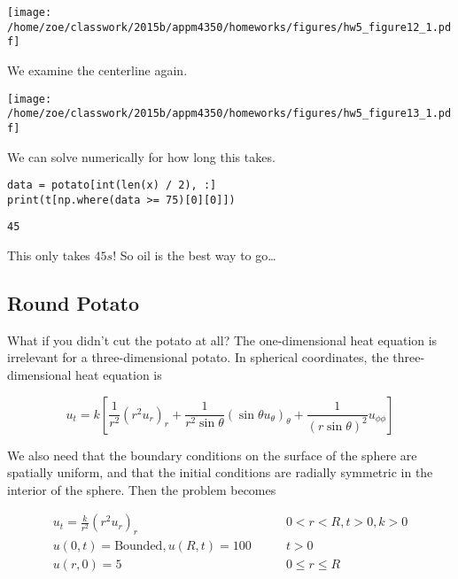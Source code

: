 \documentclass[10pt]{article}
\begin{document}
\begin{easylist}[enumerate]
\simpleweave

\texttt{[image: /home/zoe/classwork/2015b/appm4350/homeworks/figures/hw5\_figure12\_1.pdf]}

\nosimpleweave

    We examine the centerline again.

\simpleweave

\texttt{[image: /home/zoe/classwork/2015b/appm4350/homeworks/figures/hw5\_figure13\_1.pdf]}

\nosimpleweave

    We can solve numerically for how long this takes.

\weave

\begin{verbatim}
data = potato[int(len(x) / 2), :]
print(t[np.where(data >= 75)[0][0]])
\end{verbatim}
\begin{verbatim}
45

\end{verbatim}

\noweave

    This only takes $45s$! So oil is the best way to go\ldots

    \end{easylist}

    \newpage

    \subsection{Round Potato}
    What if you didn't cut the potato at all? The one-dimensional heat equation is irrelevant for a three-dimensional
    potato. In spherical coordinates, the three-dimensional heat equation is

    \[
        u_t = k \left[ \frac{1}{r^2} {\left(r^2 u_r\right)}_r + \frac{1}{r^2 \sin \theta} {(\sin\theta u_\theta)}_\theta + \frac{1}{{(r \sin \theta)}^2} u_{\phi\phi} \right]
    \]

    We also need that the boundary conditions on the surface of the sphere are spatially uniform, and that the initial
    conditions are radially symmetric in the interior of the sphere.  Then the problem becomes

    \begin{align*}
        u_t = \frac{k}{r^2} {(r^2 u_r)}_r \qquad & 0 < r < R, t > 0, k > 0\\
        u(0, t) = \text{Bounded}, u(R, t) = 100 \qquad & t > 0\\
        u(r, 0) = 5 \qquad & 0 \le r \le R\\
    \end{align*}
\end{document}
